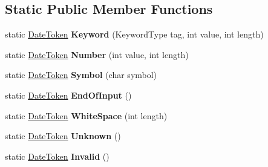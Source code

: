 \subsection*{Static Public Member Functions}
\begin{DoxyCompactItemize}
\item 
static \hyperlink{structv8_1_1internal_1_1_date_parser_1_1_date_token}{Date\+Token} {\bfseries Keyword} (Keyword\+Type tag, int value, int length)\hypertarget{structv8_1_1internal_1_1_date_parser_1_1_date_token_abfb4d29834c8a1e3d1a8366b31b682d0}{}\label{structv8_1_1internal_1_1_date_parser_1_1_date_token_abfb4d29834c8a1e3d1a8366b31b682d0}

\item 
static \hyperlink{structv8_1_1internal_1_1_date_parser_1_1_date_token}{Date\+Token} {\bfseries Number} (int value, int length)\hypertarget{structv8_1_1internal_1_1_date_parser_1_1_date_token_a5d5e938f9dfff111eab1900ba9e2dece}{}\label{structv8_1_1internal_1_1_date_parser_1_1_date_token_a5d5e938f9dfff111eab1900ba9e2dece}

\item 
static \hyperlink{structv8_1_1internal_1_1_date_parser_1_1_date_token}{Date\+Token} {\bfseries Symbol} (char symbol)\hypertarget{structv8_1_1internal_1_1_date_parser_1_1_date_token_a33a5e98a02b45f7cb8cc4081f42b89f7}{}\label{structv8_1_1internal_1_1_date_parser_1_1_date_token_a33a5e98a02b45f7cb8cc4081f42b89f7}

\item 
static \hyperlink{structv8_1_1internal_1_1_date_parser_1_1_date_token}{Date\+Token} {\bfseries End\+Of\+Input} ()\hypertarget{structv8_1_1internal_1_1_date_parser_1_1_date_token_abcd4bc759e03f335de8a1ad4046a7a45}{}\label{structv8_1_1internal_1_1_date_parser_1_1_date_token_abcd4bc759e03f335de8a1ad4046a7a45}

\item 
static \hyperlink{structv8_1_1internal_1_1_date_parser_1_1_date_token}{Date\+Token} {\bfseries White\+Space} (int length)\hypertarget{structv8_1_1internal_1_1_date_parser_1_1_date_token_ad52ebb9831eeb0b10e3cf516c092b28d}{}\label{structv8_1_1internal_1_1_date_parser_1_1_date_token_ad52ebb9831eeb0b10e3cf516c092b28d}

\item 
static \hyperlink{structv8_1_1internal_1_1_date_parser_1_1_date_token}{Date\+Token} {\bfseries Unknown} ()\hypertarget{structv8_1_1internal_1_1_date_parser_1_1_date_token_a1eec3b3ec2a966c596791b259e58df25}{}\label{structv8_1_1internal_1_1_date_parser_1_1_date_token_a1eec3b3ec2a966c596791b259e58df25}

\item 
static \hyperlink{structv8_1_1internal_1_1_date_parser_1_1_date_token}{Date\+Token} {\bfseries Invalid} ()\hypertarget{structv8_1_1internal_1_1_date_parser_1_1_date_token_a7dccf61b8aff7f8a6fc9db8b192f5914}{}\label{structv8_1_1internal_1_1_date_parser_1_1_date_token_a7dccf61b8aff7f8a6fc9db8b192f5914}

\end{DoxyCompactItemize}
